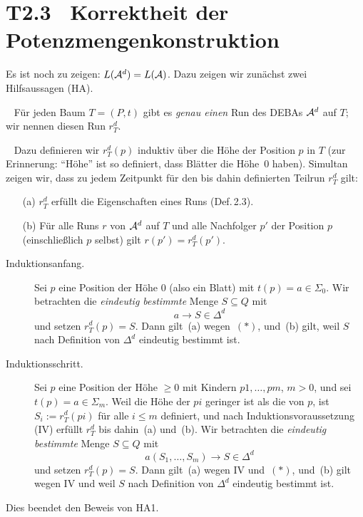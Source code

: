 \documentclass[fontsize=11pt, twoside=false, numbers=autoenddot]{scrbook}
\begin{document}
\goodbreak
\section*{T2.3~ Korrektheit der Potenzmengenkonstruktion}

Es ist noch zu zeigen: $L(\mathcal{A}^d) = L(\mathcal{A})$.
Dazu zeigen wir zunächst zwei Hilfsaussagen (HA).

\parII
{}~ Für jeden Baum $T=(P,t)$ gibt es \emph{genau einen} Run
des DEBAs $\mathcal{A}^d$ auf $T$; wir nennen diesen Run $r_T^d$.

\parII
{}~
Dazu definieren wir $r_T^d(p)$ induktiv über die Höhe der Position $p$ in $T$
(zur Erinnerung: "`Höhe"' ist so definiert, dass Blätter die Höhe~0 haben).
Simultan zeigen wir, dass zu jedem Zeitpunkt für den bis dahin definierten Teilrun $r_T^d$
gilt:
%
\begin{enumerate}
  \item[(a)]
    $r_T^d$ erfüllt die Eigenschaften eines Runs (Def.\,2.3).
  \item[(b)]
    Für alle Runs $r$ von $\mathcal{A}^d$ auf $T$ und alle Nachfolger $p'$ der Position $p$
    (einschließlich $p$ selbst) gilt $r(p') = r_T^d(p')$.
\end{enumerate}
%
\begin{description}
  \item[Induktionsanfang.]
    Sei $p$ eine Position der Höhe 0 (also ein Blatt) mit $t(p) = a \in \Sigma_0$.
    Wir betrachten die \emph{eindeutig bestimmte} Menge $S \subseteq Q$ mit
    \[
      \tag{$*$}
      a \to S \in \Delta^d
    \]
    und setzen $r_T^d(p) = S$.
    Dann gilt~(a) wegen~$(*)$, und~(b) gilt, weil $S$ nach Definition von $\Delta^d$
    eindeutig bestimmt ist.
  \item[Induktionsschritt.]
    Sei $p$ eine Position der Höhe $\geq 0$ mit Kindern $p1,\dots,pm$, $m > 0$,
    und sei $t(p) = a \in \Sigma_m$.
    Weil die Höhe der $pi$ geringer ist als die von $p$,
    ist $S_i := r_T^d(pi)$ für alle $i \leq m$ definiert,
    und nach Induktionsvoraussetzung (IV) erfüllt $r_T^d$ bis dahin~(a) und~(b).
    Wir betrachten die \emph{eindeutig bestimmte} Menge $S \subseteq Q$ mit
    \[
      \tag{$**$}
      a(S_1,\dots,S_m) \to S \in \Delta^d
    \]
    und setzen $r_T^d(p) = S$.
    Dann gilt~(a) wegen IV und~$(*)$, und~(b) gilt wegen IV und weil $S$ nach Definition von $\Delta^d$
    eindeutig bestimmt ist.
\end{description}
%
Dies beendet den Beweis von HA1.
\end{document}

